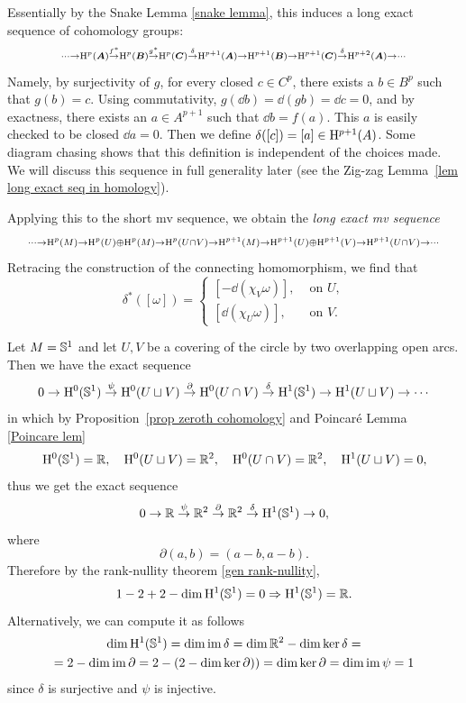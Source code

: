 Essentially by the Snake Lemma \ref{snake lemma}, this induces a long exact sequence of cohomology groups:
\[
\scriptstyle
\cdots\to \mathrm{H}^p(\boldsymbol{A})\overset{f^\ast}\to \mathrm{H}^p(\boldsymbol{B})\overset{g^\ast}\to \mathrm{H}^p(\boldsymbol{C})\overset\delta\to \mathrm{H}^{p+1}(\boldsymbol{A})\to \mathrm{H}^{p+1}(\boldsymbol{B})\to \mathrm{H}^{p+1}(\boldsymbol{C})\overset\delta\to \mathrm{H}^{p+2}(\boldsymbol{A})\to \cdots
\]
Namely, by surjectivity of $g$, for every closed $c\in C^p$, there exists a $b\in B^p$ such that $g(b)=c$. Using commutativity,  $g(\dd b)=\dd (gb)=\dd c=0$, and by exactness, there exists an $a\in A^{p+1}$ such that $\dd b=f(a)$. This $a$ is easily checked to be closed $\dd a=0$. Then we define $\delta([c])=[a]\in \mathrm{H}^{p+1}(A)$. Some diagram chasing shows that this definition is independent of the choices made. We will discuss this sequence in full generality later (see the Zig-zag Lemma~\ref{lem long exact seq in homology}).

Applying this to the short \gls{mv} sequence, we obtain the \emph{long exact \gls{mv} sequence}
\[
\scriptstyle
\cdots\to \mathrm{H}^p(M)\to \mathrm{H}^p(U)\oplus \mathrm{H}^p(M)\to \mathrm{H}^p(U\cap V)\to \mathrm{H}^{p+1}(M)\to \mathrm{H}^{p+1}(U)\oplus \mathrm{H}^{p+1}(V)\to \mathrm{H}^{p+1}(U\cap V)\to \cdots
\]
Retracing the construction of the connecting homomorphism, we find that 
\[\delta^\ast([\omega])=
    \begin{cases}
        [-\dd (\chi_V \omega)],& \text{ on }U,\\
        [\dd (\chi_U \omega)],& \text{ on }V.
    \end{cases}
\]

\begin{example}\label{de Rham of circle}
    Let $M=\mathbb{S}^1$ and let $U,V$ be a covering of the circle by two overlapping open arcs. Then we have the exact sequence
    \[0\to \mathrm{H}^0(\mathbb{S}^1)\overset\psi\to \mathrm{H}^0(U\sqcup V)\overset\partial\to \mathrm{H}^0(U\cap V)\overset\delta\to \mathrm{H}^1(\mathbb{S}^1)\to \mathrm{H}^1(U\sqcup V)\to \cdots \]
    in which by Proposition~\ref{prop zeroth cohomology} and Poincar\'e Lemma \ref{Poincare lem}
    \[\mathrm{H}^0(\mathbb{S}^1)=\mathbb{R},\quad \mathrm{H}^0(U\sqcup V)=\mathbb{R}^2,\quad \mathrm{H}^0(U\cap V)=\mathbb{R}^2,\quad \mathrm{H}^1(U\sqcup V)=0,\]
    thus we get the exact sequence
    \[0\to \mathbb{R}\overset\psi\to \mathbb{R}^2\overset{\partial}\to \mathbb{R}^2\overset\delta\to \mathrm{H}^1(\mathbb{S}^1)\to 0,\]
    where
    \[\partial(a,b)=(a-b,a-b).\]
    Therefore by the rank-nullity theorem \ref{gen rank-nullity},
    \[1-2+2-\dim \mathrm{H}^1(\mathbb{S}^1)=0\Rightarrow \mathrm{H}^1(\mathbb{S}^1)=\mathbb{R}.\]
    Alternatively, we can compute it as follows
    \begin{multline}
        \dim \mathrm{H}^1(\mathbb{S}^1)=\dim \operatorname{im} \delta=\dim \mathbb{R}^2-\dim\ker\delta=\\=2-\dim\operatorname{im} \partial=2-(2-\dim\ker\partial))=\dim\ker\partial=\dim\operatorname{im}\psi =1
    \end{multline}
    since $\delta$ is surjective and $\psi$ is injective.
\end{example}


